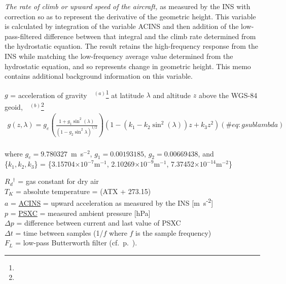 \documentclass[
  english,
]{book}
\begin{document}
\emph{The rate of climb or upward speed of the aircraft,} as measured by
the INS with correction so as to represent the derivative of the
geometric height. This variable is calculated by integration of the
variable ACINS and then addition of the low-pass-filtered difference
between that integral and the climb rate determined from the hydrostatic
equation. The result retains the high-frequency response from the INS
while matching the low-frequency average value determined from the
hydrostatic equation, and so represents change in geometric height. This
memo contains additional background information on this variable.

\(g\) = \label{-constant-g}acceleration of
gravity~~\(^{(a)}\)\footnote{ } at latitude \(\lambda\) and altitude
\(z\) above the WGS-84
geoid,~~\(^{(b)}\)\footnote{}\\
\begin{align}
g(z,\lambda)=g_{e}\left(\frac{1+g_{1}\sin^{2}(\lambda)}{(1-g_{2}\sin^{2}\lambda)^{1/2}}\right)(1-(k_{1}-k_{2}\sin^{2}(\lambda))z+k_{3}z^{2})
(\#eq:gsublambda)
\end{align}\\
\hspace*{0.333em}\hspace*{0.333em}\hspace*{0.333em}\hspace*{0.333em}\hspace*{0.333em}\hspace*{0.333em}\hspace*{0.333em}where
\(g_{e}=9.780327\)~m~s\(^{-2}\), \(g_{1}=0.00193185\),
\(g_{2}=0.00669438\), and\\
\hspace*{0.333em}\hspace*{0.333em}\hspace*{0.333em}\hspace*{0.333em}\hspace*{0.333em}\hspace*{0.333em}\hspace*{0.333em}
\{\(k_{1},k_{2},k_{3}\)\} = \{3.15704\(\times 10^{-7}\mathrm{m}^{-1}\),
2.10269\(\times 10^{-9}\mathrm{m}^{-1}\),
7.37452\(\times 10^{-14}\mathrm{m}^{-2}\)\}

\(R_{d}{}^{\dagger}\) = gas constant for dry air\\
\(T_{K}\) = absolute temperature = (ATX + 273.15)\\
\(a\) = \protect\hyperlink{acins}{ACINS} = upward acceleration as
measured by the INS {[}m~s\textsuperscript{-2}{]}\\
\(p\) = \protect\hyperlink{psx}{PSXC} = measured ambient pressure
{[}hPa{]}\\
\(\Delta p\) = difference between current and last value of PSXC\\
\(\Delta t\) = time between samples (1/\(f\) where \(f\) is the sample
frequency)\\
\(F_{L}\) = low-pass Butterworth filter (cf.~p.~\pageref{compFilter}).
\end{document}
